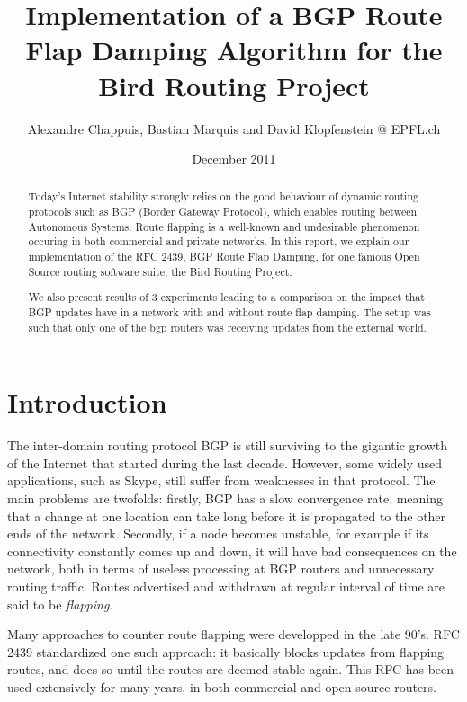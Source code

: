\documentclass[a4paper,english]{IEEEtran}
\begin{document}
\date{December 2011}

\author{Alexandre Chappuis, Bastian Marquis and David Klopfenstein @ EPFL.ch}

\title{Implementation of a BGP Route Flap Damping Algorithm for the Bird
Routing Project}

\maketitle

\begin{abstract}
Today's Internet stability strongly relies on the good behaviour of
dynamic routing protocols such as BGP (Border Gateway Protocol), which
enables routing between Autonomous Systems. Route flapping is a well-known
and undesirable phenomenon occuring in both commercial and private
networks. In this report, we explain our implementation of the RFC
2439, BGP Route Flap Damping, for one famous Open Source routing software
suite, the Bird Routing Project.

We also present results of 3 experiments leading to a comparison on the impact that
BGP updates have in a network with and without route flap damping. The setup was
such that only one of the bgp routers was receiving updates from the external world.
\end{abstract}

\section{Introduction}

The inter-domain routing protocol BGP is still surviving to the gigantic
growth of the Internet that started during the last decade. However,
some widely used applications, such as Skype, still suffer from weaknesses
in that protocol. The main problems are twofolds: firstly, BGP has
a slow convergence rate, meaning that a change at one location can take
long before it is propagated to the other ends of the network.
Secondly, if a node becomes unstable, for example if its connectivity
constantly comes up and down, it will have bad consequences on the
network, both in terms of useless processing at BGP routers and unnecessary
routing traffic. Routes advertised and withdrawn at regular interval
of time are said to be \textit{flapping}.

Many approaches to counter route flapping were developped in
the late 90's. RFC 2439\cite{rfc2439} standardized one such approach:
it basically blocks updates from flapping routes, and does so until
the routes are deemed stable again. This RFC has been used extensively
for many years, in both commercial and open source routers.
\end{document}
